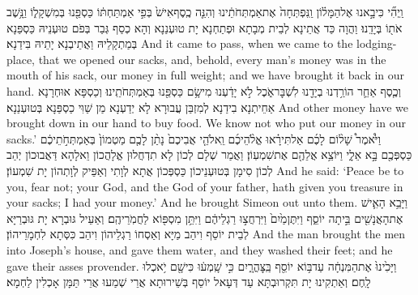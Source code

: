 {וַֽיְהִ֞י כִּי\maqqaf בָ֣אנוּ אֶל\maqqaf הַמָּל֗וֹן וַֽנִּפְתְּחָה֙ אֶת\maqqaf אַמְתְּחֹתֵ֔ינוּ וְהִנֵּ֤ה כֶֽסֶף\maqqaf אִישׁ֙ בְּפִ֣י אַמְתַּחְתּ֔וֹ כַּסְפֵּ֖נוּ בְּמִשְׁקָל֑וֹ וַנָּ֥שֶׁב אֹת֖וֹ בְּיָדֵֽנוּ׃}
{וַהֲוָה כַּד אֲתֵינָא לְבֵית מְבָתָא וּפְתַחְנָא יָת טוּעְנַנָא וְהָא כְסַף גְּבַר בְּפֹם טוּעְנֵיהּ כַּסְפַּנָא בְּמַתְקָלֵיהּ וַאֲתֵיבְנָא יָתֵיהּ בִּידַנָא׃}
{And it came to pass, when we came to the lodging-place, that we opened our sacks, and, behold, every man’s money was in the mouth of his sack, our money in full weight; and we have brought it back in our hand.}{}
{וְכֶ֧סֶף אַחֵ֛ר הוֹרַ֥דְנוּ בְיָדֵ֖נוּ לִשְׁבׇּר\maqqaf אֹ֑כֶל לֹ֣א יָדַ֔עְנוּ מִי\maqqaf שָׂ֥ם כַּסְפֵּ֖נוּ בְּאַמְתְּחֹתֵֽינוּ׃}
{וְכַסְפָּא אוּחְרָנָא אַחֵיתְנָא בִידַנָא לְמִזְבַּן עֲבוּרָא לָא יְדַעְנָא מַן שַׁוִּי כַסְפַּנָא בְּטוּעְנַנָא׃}
{And other money have we brought down in our hand to buy food. We know not who put our money in our sacks.’}{}
{וַיֹּ֩אמֶר֩ שָׁל֨וֹם לָכֶ֜ם אַל\maqqaf תִּירָ֗אוּ אֱלֹ֨הֵיכֶ֜ם וֵֽאלֹהֵ֤י אֲבִיכֶם֙ נָתַ֨ן לָכֶ֤ם מַטְמוֹן֙ בְּאַמְתְּחֹ֣תֵיכֶ֔ם כַּסְפְּכֶ֖ם בָּ֣א אֵלָ֑י וַיּוֹצֵ֥א אֲלֵהֶ֖ם אֶת\maqqaf שִׁמְעֽוֹן׃}
{וַאֲמַר שְׁלָם לְכוֹן לָא תִדְחֲלוּן אֱלָהֲכוֹן וֵאלָהָא דַּאֲבוּכוֹן יְהַב לְכוֹן סִימָן בְּטוּעְנֵיכוֹן כַּסְפְּכוֹן אֲתָא לְוָתִי וְאַפֵּיק לְוָתְהוֹן יָת שִׁמְעוֹן׃}
{And he said: ‘Peace be to you, fear not; your God, and the God of your father, hath given you treasure in your sacks; I had your money.’ And he brought Simeon out unto them.}{}
{וַיָּבֵ֥א הָאִ֛ישׁ אֶת\maqqaf הָאֲנָשִׁ֖ים בֵּ֣יתָה יוֹסֵ֑ף וַיִּתֶּן\maqqaf מַ֙יִם֙ וַיִּרְחֲצ֣וּ רַגְלֵיהֶ֔ם וַיִּתֵּ֥ן מִסְפּ֖וֹא לַחֲמֹֽרֵיהֶֽם׃}
{וְאַעֵיל גּוּבְרָא יָת גּוּבְרַיָּא לְבֵית יוֹסֵף וִיהַב מַיָּא וְאַסְחוֹ רַגְלֵיהוֹן וִיהַב כִּסְּתָא לִחְמָרֵיהוֹן׃}
{And the man brought the men into Joseph’s house, and gave them water, and they washed their feet; and he gave their asses provender.}{}
{וַיָּכִ֙ינוּ֙ אֶת\maqqaf הַמִּנְחָ֔ה עַד\maqqaf בּ֥וֹא יוֹסֵ֖ף בַּֽצׇּהֳרָ֑יִם כִּ֣י שָֽׁמְע֔וּ כִּי\maqqaf שָׁ֖ם יֹ֥אכְלוּ לָֽחֶם׃}
{וְאַתְקִינוּ יָת תִּקְרוּבְתָּא עַד דְּעָאל יוֹסֵף בְּשֵׁירוּתָא אֲרֵי שְׁמַעוּ אֲרֵי תַּמָּן אָכְלִין לַחְמָא׃}
